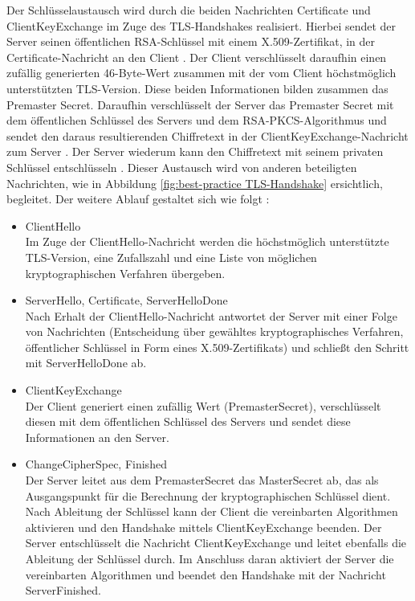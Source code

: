 \bigbreak
Der Schlüsselaustausch wird durch die beiden Nachrichten \glqq{}Certificate\grqq{} und \glqq{}ClientKeyExchange\grqq{} im Zuge des TLS-Handshakes realisiert. Hierbei sendet der Server seinen öffentlichen RSA-Schlüssel mit einem X.509-Zertifikat, in der \glqq{}Certificate\grqq{}-Nachricht an den Client \autocite{X509}. Der Client verschlüsselt daraufhin einen zufällig generierten 46-Byte-Wert zusammen mit der vom Client höchstmöglich unterstützten TLS-Version. Diese beiden Informationen bilden zusammen das \glqq{}Premaster Secret\grqq{}. Daraufhin verschlüsselt der Server das Premaster Secret mit dem öffentlichen Schlüssel des Servers und dem RSA-PKCS-Algorithmus und sendet den daraus resultierenden Chiffretext in der \glqq{}ClientKeyExchange\grqq{}-Nachricht zum Server \autocite{RSAPKCS}. Der Server wiederum kann den Chiffretext mit seinem privaten Schlüssel entschlüsseln \autocite{RFC3447}. Dieser Austausch wird von anderen beteiligten Nachrichten, wie in Abbildung \ref{fig:best-practice TLS-Handshake} ersichtlich, begleitet. \autocite{SchwenkJörg2020SuKi} 
\bigbreak
Der weitere Ablauf gestaltet sich wie folgt \autocite{SchwenkJörg2020SuKi}:
\begin{itemize}
    \item ClientHello\\
    Im Zuge der ClientHello-Nachricht werden die höchstmöglich unterstützte TLS-Version, eine Zufallszahl und eine Liste von möglichen kryptographischen Verfahren übergeben.
    \item ServerHello, Certificate, ServerHelloDone\\
    Nach Erhalt der ClientHello-Nachricht antwortet der Server mit einer Folge von Nachrichten (Entscheidung über gewähltes kryptographisches Verfahren, öffentlicher Schlüssel in Form eines X.509-Zertifikats) und schließt den Schritt mit ServerHelloDone ab. 
    \item ClientKeyExchange\\
    Der Client generiert einen zufällig Wert (PremasterSecret), verschlüsselt diesen mit dem öffentlichen Schlüssel des Servers und sendet diese Informationen an den Server.
    \item ChangeCipherSpec, Finished\\
    Der Server leitet aus dem PremasterSecret das MasterSecret ab, das als Ausgangspunkt für die Berechnung der kryptographischen Schlüssel dient. Nach Ableitung der Schlüssel kann der Client die vereinbarten Algorithmen aktivieren und den Handshake mittels ClientKeyExchange beenden. Der Server entschlüsselt die Nachricht ClientKeyExchange und leitet ebenfalls die Ableitung der Schlüssel durch. Im Anschluss daran aktiviert der Server die vereinbarten Algorithmen und beendet den Handshake mit der Nachricht ServerFinished.
\end{itemize}
